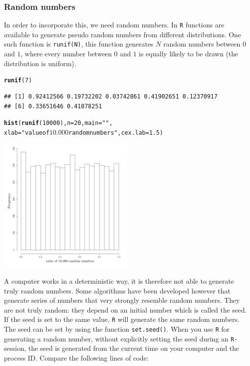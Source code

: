 \documentclass{article}\usepackage[]{graphicx}\usepackage[]{color}
\makeatletter
\newcommand{\hlnum}[1]{\textcolor[rgb]{0.686,0.059,0.569}{#1}}%
\newcommand{\hlstr}[1]{\textcolor[rgb]{0.192,0.494,0.8}{#1}}%
\newcommand{\hlstd}[1]{\textcolor[rgb]{0.345,0.345,0.345}{#1}}%
\newcommand{\hlkwc}[1]{\textcolor[rgb]{0.333,0.667,0.333}{#1}}%
\newcommand{\hlkwd}[1]{\textcolor[rgb]{0.737,0.353,0.396}{\textbf{#1}}}%
\newenvironment{kframe}{%
 \def\at@end@of@kframe{}%
 \ifinner\ifhmode%
  \def\at@end@of@kframe{\end{minipage}}%
  \begin{minipage}{\columnwidth}%
 \fi\fi%
 \def\FrameCommand##1{\hskip\@totalleftmargin \hskip-\fboxsep
 \colorbox{shadecolor}{##1}\hskip-\fboxsep
     \hskip-\linewidth \hskip-\@totalleftmargin \hskip\columnwidth}%
 \MakeFramed {\advance\hsize-\width
   \@totalleftmargin\z@ \linewidth\hsize
   \@setminipage}}%
 {\par\unskip\endMakeFramed%
 \at@end@of@kframe}
\newenvironment{knitrout}{}{} %
\makeatother
\begin{document}
\subsubsection{Random numbers}
In order to incorporate this, we need random numbers. In \texttt{R} functions are available to generate pseudo random numbers from different distributions. One such function is \texttt{runif(N)}, this function generates $N$ random numbers between $0$ and $1$, where every number between $0$ and $1$ is equally likely to be drawn (the distribution is uniform).
\begin{knitrout}
\color{fgcolor}\begin{kframe}
\begin{alltt}
\hlkwd{runif}\hlstd{(}\hlnum{7}\hlstd{)}
\end{alltt}
\begin{verbatim}
## [1] 0.92412566 0.19732202 0.03742861 0.41902651 0.12370917
## [6] 0.33651646 0.41878251
\end{verbatim}
\begin{alltt}
\hlkwd{hist}\hlstd{(}\hlkwd{runif}\hlstd{(}\hlnum{10000}\hlstd{),}\hlkwc{n}\hlstd{=}\hlnum{20}\hlstd{,}\hlkwc{main}\hlstd{=}\hlstr{""}\hlstd{,}
     \hlkwc{xlab}\hlstd{=}\hlstr{"value of $10.000$ random numbers"}\hlstd{,} \hlkwc{cex.lab}\hlstd{=}\hlnum{1.5}\hlstd{)}
\end{alltt}
\end{kframe}

{\centering \includegraphics[width=0.5\textwidth]{figure/k19-1} 

}



\end{knitrout}
A computer works in a deterministic way, it is therefore not able to generate truly random numbers. Some algorithms have been developed however that generate series of numbers that very strongly resemble random numbers. They are not truly random: they depend on an initial number which is called the seed. If the seed is set to the same value, \texttt{R} will generate the same random numbers. The seed can be set by using the function \texttt{set.seed()}. When you use \texttt{R} for generating a random number, without explicitly setting the seed during an \texttt{R-}session, the seed is generated from the current time on your computer and the process ID. Compare the following lines of code:
\end{document}
